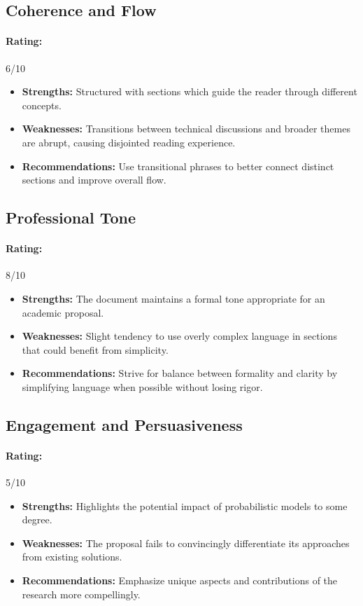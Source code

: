 \documentclass{article}
\begin{document}
\subsection{Coherence and Flow}
\paragraph{Rating:} 6/10
\begin{itemize}
    \item \textbf{Strengths:} Structured with sections which guide the reader through different concepts.
    \item \textbf{Weaknesses:} Transitions between technical discussions and broader themes are abrupt, causing disjointed reading experience.
    \item \textbf{Recommendations:} Use transitional phrases to better connect distinct sections and improve overall flow.
\end{itemize}

\subsection{Professional Tone}
\paragraph{Rating:} 8/10
\begin{itemize}
    \item \textbf{Strengths:} The document maintains a formal tone appropriate for an academic proposal.
    \item \textbf{Weaknesses:} Slight tendency to use overly complex language in sections that could benefit from simplicity.
    \item \textbf{Recommendations:} Strive for balance between formality and clarity by simplifying language when possible without losing rigor.
\end{itemize}

\subsection{Engagement and Persuasiveness}
\paragraph{Rating:} 5/10
\begin{itemize}
    \item \textbf{Strengths:} Highlights the potential impact of probabilistic models to some degree.
    \item \textbf{Weaknesses:} The proposal fails to convincingly differentiate its approaches from existing solutions.
    \item \textbf{Recommendations:} Emphasize unique aspects and contributions of the research more compellingly.
\end{itemize}
\end{document}
